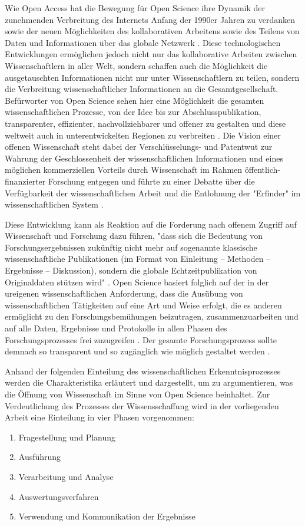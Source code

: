 Wie Open Access hat die Bewegung für Open Science ihre Dynamik der zunehmenden Verbreitung des Internets Anfang der 1990er Jahren zu verdanken \cite{Lievrouw_2010} sowie der neuen Möglichkeiten des kollaborativen Arbeitens sowie des Teilens von Daten und Informationen über das globale Netzwerk \cite{Meyer_2013}. Diese technologischen Entwicklungen ermöglichen jedoch nicht nur das kollaborative Arbeiten zwischen Wissenschaftlern in aller Welt, sondern schaffen auch die Möglichkeit die ausgetauschten Informationen nicht nur unter Wissenschaftlern zu teilen, sondern die Verbreitung wissenschaftlicher Informationen an die Gesamtgesellschaft. Befürworter von Open Science sehen hier eine Möglichkeit die gesamten wissenschaftlichen Prozesse, von der Idee bis zur Abschlusspublikation, transparenter, effizienter, nachvollziehbarer und offener zu gestalten \cite{Woelfle_2011} und diese weltweit auch in unterentwickelten Regionen zu verbreiten \cite{yiotis_2013_open}. Die Vision einer offenen Wissenschaft steht dabei der Verschlüsselungs- und Patentwut zur Wahrung der Geschlossenheit der wissenschaftlichen Informationen und eines möglichen kommerziellen Vorteils durch Wissenschaft im Rahmen öffentlich-finanzierter Forschung entgegen und führte zu einer Debatte über die Verfügbarkeit der wissenschaftlichen Arbeit und die Entlohnung der "Erfinder" im wissenschaftlichen System \cite{suchen}.

Diese Entwicklung kann als Reaktion auf die Forderung nach offenem Zugriff auf Wissenschaft und Forschung dazu führen, "dass sich die Bedeutung von Forschungsergebnissen zukünftig nicht mehr auf sogenannte klassische wissenschaftliche Publikationen (im Format von Einleitung – Methoden – Ergebnisse – Diskussion), sondern die globale Echtzeitpublikation von Originaldaten stützen wird" \cite{Stengel_2013}. Open Science basiert folglich auf der in der ureigenen wissenschaftlichen Anforderung, dass die Ausübung von wissenschaftlichen Tätigkeiten auf eine Art und Weise erfolgt, die es anderen ermöglicht zu den Forschungsbemühungen beizutragen, zusammenzuarbeiten und auf alle Daten, Ergebnisse und Protokolle in allen Phasen des Forschungsprozesses frei zuzugreifen \cite{RIN_2010_open_research}. Der gesamte Forschungsprozess sollte demnach so transparent und so zugänglich wie möglich gestaltet werden \cite{Scheliga_2014}.

Anhand der folgenden Einteilung des wissenschaftlichen Erkenntnisprozesses werden die Charakteristika erläutert und dargestellt, um zu argumentieren, was die Öffnung von Wissenschaft im Sinne von Open Science beinhaltet. Zur Verdeutlichung des Prozesses der Wissensschaffung wird in der vorliegenden Arbeit eine Einteilung in vier Phasen vorgenommen:
\begin{enumerate}
\item Fragestellung und Planung
\item Ausführung
\item Verarbeitung und Analyse
\item Auswertungsverfahren
\item Verwendung und Kommunikation der Ergebnisse
\end{enumerate}

